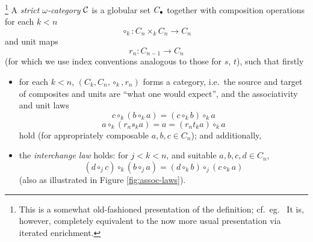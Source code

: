 \begin{definition}\footnote{This is a somewhat old-fashioned presentation of the definition; cf.\ eg.\ \cite{street:algebra-of-oriented-simplices}  It is, however, completely equivalent to the now more usual presentation via iterated enrichment.}
A \emph{strict $\omega$-category} $\mathcal{C}$ is a globular set $C_\bullet$ together with composition operations for each $k < n$
\[\circ_k \colon C_n \times_k C_n \to C_n\]
and unit maps
\[r_n \colon C_{n-1} \to C_n\]
(for which we use index conventions analogous to those for $s$, $t$),
 such that firstly
\begin{itemize}
\item for each $k < n$, $(C_k,C_n, \circ_k, r_n)$ forms a category, i.e.\ the source and target of composites and units are ``what one would expect'', and the associativity and unit laws
\[ c \circ_k (b \circ_k a) = (c \circ_k b) \circ_k a\]
\[ a \circ_k (r_n s_k a) = a = (r_n t_k a) \circ_k a\]
hold (for appropriately composable $a, b, c \in C_n$); and additionally,
\item the \emph{interchange law} holds: for $j < k < n$, and suitable $a,b,c,d \in C_n$,
\[ (d \circ_j c) \circ_k (b \circ_j a) = (d \circ_k b) \circ_j (c \circ_k a)\]
(also as illustrated in Figure \ref{fig:assoc-laws}). 
\end{itemize}
\end{definition}

